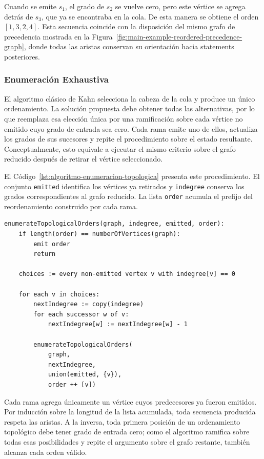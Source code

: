 Cuando se emite $s_1$, el grado de $s_2$ se vuelve cero, pero este vértice se agrega detrás de $s_3$, que ya se encontraba en la cola. De esta manera se obtiene el orden $[1,3,2,4]$. Esta secuencia coincide con la disposición del mismo grafo de precedencia mostrada en la Figura~\ref{fig:main-example-reordered-precedence-graph}, donde todas las aristas conservan su orientación hacia statements posteriores.

\subsubsection{Enumeración Exhaustiva}

El algoritmo clásico de Kahn selecciona la cabeza de la cola y produce un único ordenamiento. La solución propuesta debe obtener todas las alternativas, por lo que reemplaza esa elección única por una ramificación sobre cada vértice no emitido cuyo grado de entrada sea cero. Cada rama emite uno de ellos, actualiza los grados de sus sucesores y repite el procedimiento sobre el estado resultante. Conceptualmente, esto equivale a ejecutar el mismo criterio sobre el grafo reducido después de retirar el vértice seleccionado.

El Código~\ref{lst:algoritmo-enumeracion-topologica} presenta este procedimiento. El conjunto \texttt{emitted} identifica los vértices ya retirados y \texttt{indegree} conserva los grados correspondientes al grafo reducido. La lista \texttt{order} acumula el prefijo del reordenamiento construido por cada rama.

\begin{lstlisting}[style=haskell,caption={Pseudocódigo para enumerar los ordenamientos topológicos del grafo.},label={lst:algoritmo-enumeracion-topologica}]
enumerateTopologicalOrders(graph, indegree, emitted, order):
    if length(order) == numberOfVertices(graph):
        emit order
        return

    choices := every non-emitted vertex v with indegree[v] == 0

    for each v in choices:
        nextIndegree := copy(indegree)
        for each successor w of v:
            nextIndegree[w] := nextIndegree[w] - 1

        enumerateTopologicalOrders(
            graph,
            nextIndegree,
            union(emitted, {v}),
            order ++ [v])
\end{lstlisting}

Cada rama agrega únicamente un vértice cuyos predecesores ya fueron emitidos. Por inducción sobre la longitud de la lista acumulada, toda secuencia producida respeta las aristas. A la inversa, toda primera posición de un ordenamiento topológico debe tener grado de entrada cero; como el algoritmo ramifica sobre todas esas posibilidades y repite el argumento sobre el grafo restante, también alcanza cada orden válido.

